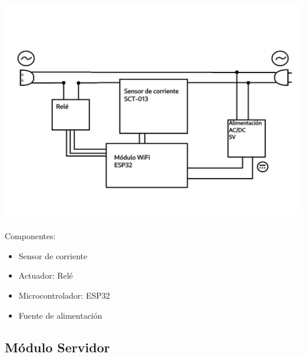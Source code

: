 \documentclass[compress, aspectratio=169]{beamer} %
\begin{document}
\begin{frame}
  \transdissolve[duration=1]
  \frametitle{\insertsubsection}
  \centering\includegraphics[scale=0.7]{img/esquema_enchufe_inteligente.png}
\end{frame}

\begin{frame}
  \transdissolve[duration=1]
  \frametitle{\insertsubsection}
  Componentes:
  \begin{itemize}
  \item{Sensor de corriente}
  \item{Actuador: Relé}
  \item{Microcontrolador: ESP32}
  \item{Fuente de alimentación}
  \end{itemize}
\end{frame}

\subsection{Módulo Servidor}
\begin{frame}
  \transdissolve[duration=1]
  \frametitle{\insertsubsection}
\end{frame}
\end{document}
